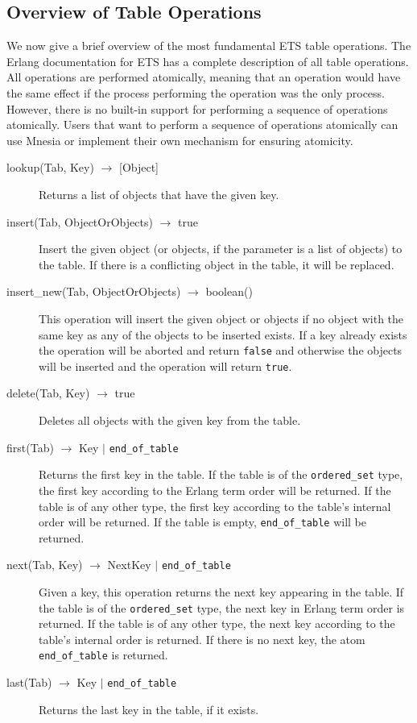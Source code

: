 \documentclass[aps,pre,preprint,nofootinbib]{revtex4}
\begin{document}
\subsection{Overview of Table Operations}\label{sec:table_operations}

We now give a brief overview of the most fundamental ETS table operations.
The Erlang documentation for ETS has a complete description of all table operations.
All operations are performed atomically, meaning that an operation would have the same effect if the process performing the operation was the only process.
However, there is no built-in support for performing a sequence of operations atomically.
Users that want to perform a sequence of operations atomically can use Mnesia or implement their own mechanism for ensuring atomicity.

\begin{description}
\item[lookup(Tab, Key) $\rightarrow$ {[Object]}]
  Returns a list of objects that have the given key.
\item[insert(Tab, ObjectOrObjects) $\rightarrow$ true]
  Insert the given object (or objects, if the parameter is a list of objects) to the table.
  If there is a conflicting object in the table, it will be replaced.
\item[insert\_new(Tab, ObjectOrObjects) $\rightarrow$ boolean()]
  This operation will insert the given object or objects if no object with the same key as any of the objects to be inserted exists.
  If a key already exists the operation will be aborted and return \verb|false| and otherwise the objects will be inserted and the operation will return \verb|true|.
\item[delete(Tab, Key) $\rightarrow$ true]
  Deletes all objects with the given key from the table.
\item[first(Tab) $\rightarrow$ Key $|$ \texttt{end\_of\_table}]
  Returns the first key in the table.
  If the table is of the \verb|ordered_set| type, the first key according to the Erlang term order will be returned.
  If the table is of any other type, the first key according to the table's internal order will be returned.
  If the table is empty, \verb|end_of_table| will be returned.
\item[next(Tab, Key) $\rightarrow$ NextKey $|$ \texttt{end\_of\_table}]
  Given a key, this operation returns the next key appearing in the table.
  If the table is of the \verb|ordered_set| type, the next key in Erlang term order is returned.
  If the table is of any other type, the next key according to the table's internal order is returned.
  If there is no next key, the atom \texttt{end\_of\_table} is returned.
\item[last(Tab) $\rightarrow$ Key $|$ \texttt{end\_of\_table}] Returns the last key in the table, if it exists.
\end{description}
\end{document}
